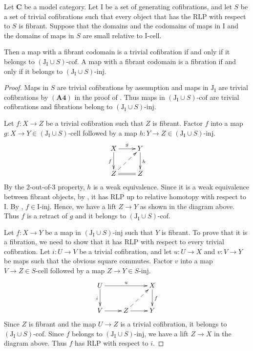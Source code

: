 \documentclass{tac}
\theoremstyle{definition}
\newcommand{\cat}[1]{\mathbf{#1}}
\newcommand{\C}{\cat{C}}
\newcommand{\I}{\mathrm{I}}
\newcommand{\J}{\mathrm{J}}
\newcommand{\class}[2]{#1\text{-}\mathrm{#2}}
\newcommand{\Iinj}[1][\I]{\class{#1}{inj}}
\newcommand{\Icell}[1][\I]{\class{#1}{cell}}
\newcommand{\Icof}[1][\I]{\class{#1}{cof}}
\begin{document}
\begin{prop}
Let $\C$ be a model category.
Let $\I$ be a set of generating cofibrations, and let $S$ be a set of trivial cofibrations
such that every object that has the RLP with respect to $S$ is fibrant.
Suppose that the domains and the codomains of maps in $\I$ and the domains of maps in $S$ are small relative to $\Icell$.

Then a map with a fibrant codomain is a trivial cofibration if and only if it belongs to $\Icof[(\J_\I \cup S)]$.
A map with a fibrant codomain is a fibration if and only if it belongs to $\Iinj[(\J_\I \cup S)]$.
\end{prop}
\begin{proof}
Maps in $S$ are trivial cofibrations by assumption and maps in $\J_\I$ are trivial cofibrations by $\mathbf{(A4)}$ in the proof of .
Thus maps in $\Icof[(\J_\I \cup S)]$ are trivial cofibrations and fibrations belong to $\Iinj[(\J_\I \cup S)]$.

Let $f : X \to Z$ be a trivial cofibration such that $Z$ is fibrant.
Factor $f$ into a map $g : X \to Y \in \Icell[(\J_\I \cup S)]$ followed by a map $h : Y \to Z \in \Iinj[(\J_\I \cup S)]$.
\[ \xymatrix{ X \ar[r]^g \ar[d]_f & Y \ar[d]^h \\
              Z \ar@{=}[r] \ar@{-->}[ur] & Z
            } \]
By the 2-out-of-3 property, $h$ is a weak equivalence.
Since it is a weak equivalence between fibrant objects, by , it has RLP up to relative homotopy with respect to $\I$.
By , $f \in \Iinj$.
Hence, we have a lift $Z \to Y$ as shown in the diagram above.
Thus $f$ is a retract of $g$ and it belongs to $\Icof[(\J_\I \cup S)]$.

Let $f : X \to Y$ be a map in $\Iinj[(\J_\I \cup S)]$ such that $Y$ is fibrant.
To prove that it is a fibration, we need to show that it has RLP with respect to every trivial cofibration.
Let $i : U \to V$ be a trivial cofibration, and let $u : U \to X$ and $v : V \to Y$ be maps such that the obvious square commutes.
Factor $v$ into a map $V \to Z \in \Icell[S]$ followed by a map $Z \to Y \in \Iinj[S]$.
\[ \xymatrix{ U \ar[rr]^u \ar[d]_i & & X \ar[d]^f \\
              V \ar[r] & Z \ar[r] \ar@{-->}[ur] & Y
            } \]
Since $Z$ is fibrant and the map $U \to Z$ is a trivial cofibration, it belongs to $\Icof[(\J_\I \cup S)]$.
Since $f$ belongs to $\Iinj[(\J_\I \cup S)]$, we have a lift $Z \to X$ in the diagram above.
Thus $f$ has RLP with respect to $i$.
\end{proof}
\end{document}
